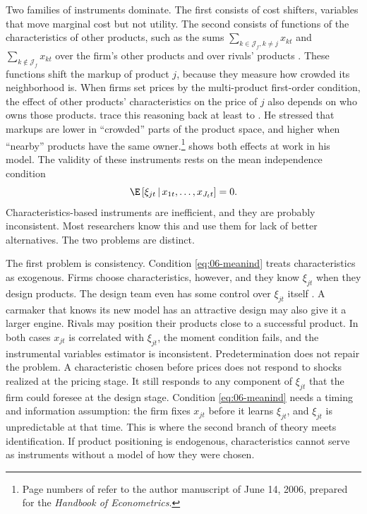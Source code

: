 Two families of instruments dominate. The first consists of cost shifters, variables that move marginal cost
but not utility. The second consists of functions of the characteristics of other products, such as the sums
$\sum_{k \in \mathcal{J}_f, k \neq j} x_{kt}$ and $\sum_{k \notin \mathcal{J}_f} x_{kt}$ over the firm's other
products and over rivals' products \citep{BerryLevinsohnPakes1995}. These functions shift the markup of
product $j$, because they measure how crowded its neighborhood is. When firms set prices by the multi-product
first-order condition, the effect of other products' characteristics on the price of $j$ also depends on who owns
those products. \citet[p.~29]{AckerbergEtAl2007} trace this reasoning back at least to \citet{Bresnahan1987}. He
stressed that markups are lower in ``crowded'' parts of the product space, and higher when ``nearby'' products have
the same owner.\footnote{Page numbers of \citet{AckerbergEtAl2007} refer to the author manuscript of June 14, 2006,
prepared for the \emph{Handbook of Econometrics}.}  shows both effects at work in his model.
The validity of these instruments rests on the mean independence condition
\begin{equation}\label{eq:06-meanind}
\E\left[\xi_{jt} \,\middle|\, x_{1t}, \dots, x_{J_t t}\right] = 0 .
\end{equation}
Characteristics-based instruments are inefficient, and they are probably inconsistent. Most researchers know
this and use them for lack of better alternatives. The two problems are distinct.

The first problem is consistency. Condition \eqref{eq:06-meanind} treats characteristics as exogenous. Firms
choose characteristics, however, and they know $\xi_{jt}$ when they design products. The design team even has
some control over $\xi_{jt}$ itself \citep[p.~30]{AckerbergEtAl2007}. A carmaker that knows its
new model has an attractive design may also give it a larger engine. Rivals may position their products close
to a successful product. In both cases $x_{jt}$ is correlated with $\xi_{jt}$, the moment condition fails, and
the instrumental variables estimator is inconsistent. Predetermination does not repair the problem. A
characteristic chosen before prices does not respond to shocks realized at the pricing stage. It still
responds to any component of $\xi_{jt}$ that the firm could foresee at the design stage. Condition
\eqref{eq:06-meanind} needs a timing and information assumption: the firm fixes $x_{jt}$ before it learns
$\xi_{jt}$, and $\xi_{jt}$ is unpredictable at that time. This is where the second branch of theory meets
identification. If product positioning is endogenous, characteristics cannot serve as instruments without a
model of how they were chosen.

